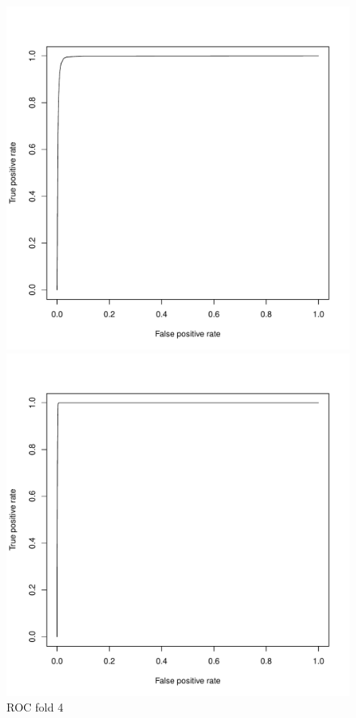 \documentclass{article}\usepackage[]{graphicx}\usepackage[]{color}
\begin{document}
\begin{figure}[h]
  \includegraphics[width=\linewidth]{ROC_block4.pdf}
  \caption{ROC fold 4}\label{}
\endminipage\hfill
{}
  \includegraphics[width=\linewidth]{ROC_block5.pdf}

\end{figure}
\end{document}
